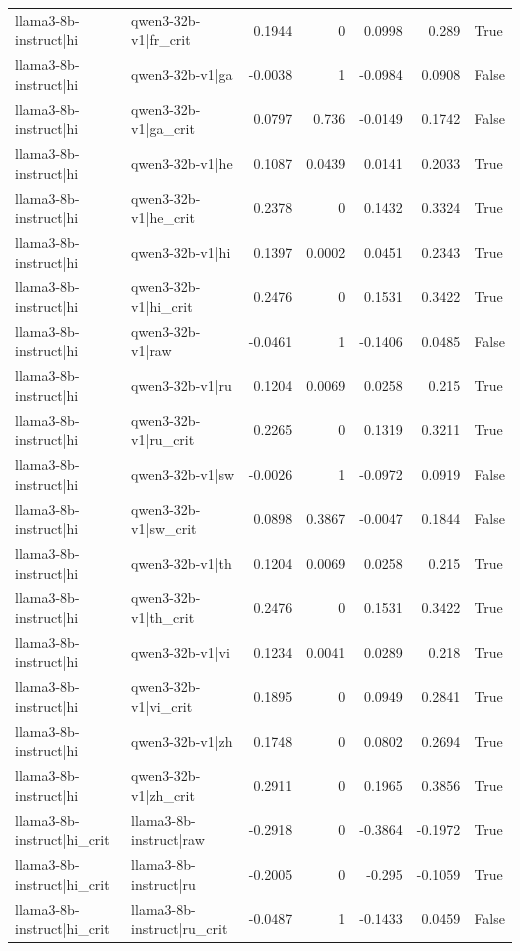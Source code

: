 \begin{table}
\begin{tabular}{l l r r r r l}
llama3-8b-instruct|hi & qwen3-32b-v1|fr_crit & 0.1944 & 0 & 0.0998 & 0.289 & True \\
llama3-8b-instruct|hi & qwen3-32b-v1|ga & -0.0038 & 1 & -0.0984 & 0.0908 & False \\
llama3-8b-instruct|hi & qwen3-32b-v1|ga_crit & 0.0797 & 0.736 & -0.0149 & 0.1742 & False \\
llama3-8b-instruct|hi & qwen3-32b-v1|he & 0.1087 & 0.0439 & 0.0141 & 0.2033 & True \\
llama3-8b-instruct|hi & qwen3-32b-v1|he_crit & 0.2378 & 0 & 0.1432 & 0.3324 & True \\
llama3-8b-instruct|hi & qwen3-32b-v1|hi & 0.1397 & 0.0002 & 0.0451 & 0.2343 & True \\
llama3-8b-instruct|hi & qwen3-32b-v1|hi_crit & 0.2476 & 0 & 0.1531 & 0.3422 & True \\
llama3-8b-instruct|hi & qwen3-32b-v1|raw & -0.0461 & 1 & -0.1406 & 0.0485 & False \\
llama3-8b-instruct|hi & qwen3-32b-v1|ru & 0.1204 & 0.0069 & 0.0258 & 0.215 & True \\
llama3-8b-instruct|hi & qwen3-32b-v1|ru_crit & 0.2265 & 0 & 0.1319 & 0.3211 & True \\
llama3-8b-instruct|hi & qwen3-32b-v1|sw & -0.0026 & 1 & -0.0972 & 0.0919 & False \\
llama3-8b-instruct|hi & qwen3-32b-v1|sw_crit & 0.0898 & 0.3867 & -0.0047 & 0.1844 & False \\
llama3-8b-instruct|hi & qwen3-32b-v1|th & 0.1204 & 0.0069 & 0.0258 & 0.215 & True \\
llama3-8b-instruct|hi & qwen3-32b-v1|th_crit & 0.2476 & 0 & 0.1531 & 0.3422 & True \\
llama3-8b-instruct|hi & qwen3-32b-v1|vi & 0.1234 & 0.0041 & 0.0289 & 0.218 & True \\
llama3-8b-instruct|hi & qwen3-32b-v1|vi_crit & 0.1895 & 0 & 0.0949 & 0.2841 & True \\
llama3-8b-instruct|hi & qwen3-32b-v1|zh & 0.1748 & 0 & 0.0802 & 0.2694 & True \\
llama3-8b-instruct|hi & qwen3-32b-v1|zh_crit & 0.2911 & 0 & 0.1965 & 0.3856 & True \\
llama3-8b-instruct|hi_crit & llama3-8b-instruct|raw & -0.2918 & 0 & -0.3864 & -0.1972 & True \\
llama3-8b-instruct|hi_crit & llama3-8b-instruct|ru & -0.2005 & 0 & -0.295 & -0.1059 & True \\
llama3-8b-instruct|hi_crit & llama3-8b-instruct|ru_crit & -0.0487 & 1 & -0.1433 & 0.0459 & False \\

\end{tabular}
\end{table}

